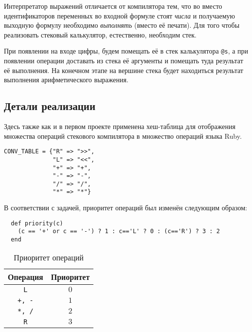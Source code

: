 Интерпретатор выражений отличается от компилятора тем, что во
вместо идентификаторов переменных во входной формуле стоят \emph{числа} и получаемую выходную формулу необходимо \emph{выполнять} (вместо её печати). Для того чтобы реализовать стековый калькулятор, естественно, необходим стек.

При появлении на входе цифры, будем помещать её в стек калькулятора \verb|@s|,
а при появлении операции доставать из стека её аргументы и помещать туда результат
её выполнения. На конечном этапе на вершине стека будет находиться результат
выполнения арифметического выражения.

\subsection{Детали реализации}

Здесь также как и в первом проекте применена хеш-таблица для отображения множества
операций стекового компилятора в множество операций языка Ruby.
\begin{lstlisting}
CONV_TABLE = {"R" => ">>",
              "L" => "<<",
              "+" => "+",
              "-" => "-",
              "/" => "/",
              "*" => "*"}
\end{lstlisting}
В соответствии с задачей, приоритет операций был изменён следующим образом:
\begin{lstlisting}
  def priority(c)
    (c == '+' or c == '-') ? 1 : c=='L' ? 0 : (c=='R') ? 3 : 2
  end
\end{lstlisting}
\begin{table}[ht!]
\caption{Приоритет операций}
\begin{center}
\begin{tabular}{|c|c|}
\hline
Операция & Приоритет \\
\hline
\verb|L| & $0$ \\
\hline
\verb|+, -| & $1$ \\
\hline
\verb|*, /| & $2$ \\
\hline
\verb|R| & $3$ \\
\hline
\end{tabular}
\end{center}
\end{table}
\newpage
